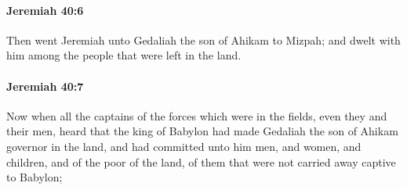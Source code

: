 		\paragraph{Jeremiah 40:6} %
			\label{JEREMIAH-40-6}

			Then went Jeremiah unto Gedaliah the son of Ahikam to Mizpah; and dwelt with him among the people that were left in the land.


		\paragraph{Jeremiah 40:7} %
			\label{JEREMIAH-40-7}

			Now when all the captains of the forces which were in the fields, even they and their men, heard that the king of Babylon had made Gedaliah the son of Ahikam governor in the land, and had committed unto him men, and women, and children, and of the poor of the land, of them that were not carried away captive to Babylon;

